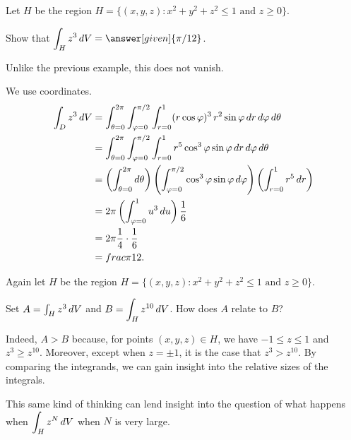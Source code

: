 \documentclass{ximera}
\begin{document}
\begin{example}
  Let $H$ be the region $H = \{ (x,y,z)  : x^2 + y^2 + z^2 \leq 1 \text{ and } z \geq 0 \}$.

  Show that $\displaystyle\int_H z^3 \d V = \answer[given]{\pi/12}$.

  \begin{explanation}
    Unlike the previous example, this does not vanish.

    We use  coordinates.
    \begin{align*}
      \int_D z^3 \d V
      &= \int_{\theta=0}^{2\pi} \int_{\varphi=0}^{\pi/2} \int_{r = 0}^1 (r \cos \varphi)^3 \, r^2 \sin \varphi \d r \d \varphi \d \theta \\
      &= \int_{\theta=0}^{2\pi} \int_{\varphi=0}^{\pi/2} \int_{r = 0}^1 r^5 \cos^3 \varphi \sin \varphi \d r \d \varphi \d \theta \\
      &= \left( \int_{\theta=0}^{2\pi} d\theta \right) \left(\int_{\varphi=0}^{\pi/2} \cos^3 \varphi \sin \varphi \d \varphi \right) \left( \int_{r = 0}^1 r^5 \d r \right) \\
      &= 2 \pi \left(\int_{\varphi=0}^{1} u^3 \d u \right) \frac{1}{6} \\
      &= 2 \pi \frac{1}{4} \cdot \frac{1}{6} \\
      &= frac{\pi}{12}.
    \end{align*}
  \end{explanation}
\end{example}

\begin{question}
  Again let $H$ be the region $H = \{ (x,y,z): \text{$x^2 + y^2 +
  z^2 \leq 1$ and $z \geq 0 $}\}$.

  Set $A = \int_H z^3 \mathop{}\!d V$ and $B = \displaystyle\int_H z^{10} \mathop{}\!d V$.  How does $A$ relate to $B$?

  \begin{multipleChoice}
  \end{multipleChoice}

  \begin{feedback}[correct]
    Indeed, $A > B$ because, for points $(x,y,z) \in H$, we have
    $-1 \leq z \leq 1$ and $z^3 \geq z^{10}$.  Moreover, except when
    $z = \pm 1$, it is the case that $z^3 > z^{10}$.  By comparing the
    integrands, we can gain insight into the relative sizes of the
    integrals.

    This same kind of thinking can lend insight into the question of
    what happens when $\displaystyle\int_H z^N \mathop{}\!d V$ when $N$ is very
    large.
  \end{feedback}
\end{question}
\end{document}
